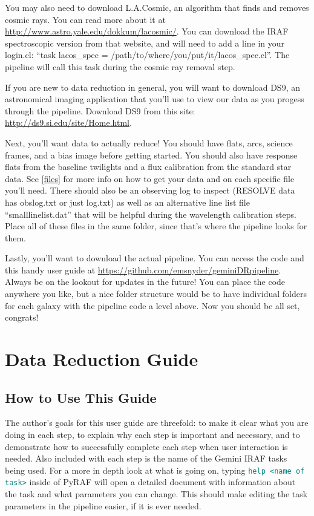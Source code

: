\documentclass[12pt]{report}
\newcommand{\ty}[1]{\textcolor{teal}{\texttt{#1}}}
\begin{document}
You may also need to download L.A.Cosmic, an algorithm that finds and removes cosmic rays. You can read more about it at \url{http://www.astro.yale.edu/dokkum/lacosmic/}. You can download the IRAF spectroscopic version from that website, and will need to add a line in your login.cl: ``task lacos\_spec = /path/to/where/you/put/it/lacos\_spec.cl''. The pipeline will call this task during the cosmic ray removal step.

If you are new to data reduction in general, you will want to download DS9, an astronomical imaging application that you'll use to view our data as you progess through the pipeline. Download DS9 from this site: \url{http://ds9.si.edu/site/Home.html}.

Next, you'll want data to actually reduce! You should have flats, arcs, science frames, and a bias image before getting started. You should also have response flats from the baseline twilights and a flux calibration from the standard star data. See \autoref{files} for more info on how to get your data and on each specific file you'll need. There should also be an observing log to inspect (RESOLVE data has obslog.txt or just log.txt) as well as an alternative line list file ``smalllinelist.dat'' that will be helpful during the wavelength calibration steps. Place all of these files in the same folder, since that's where the pipeline looks for them. 

Lastly, you'll want to download the actual pipeline. You can access the code and this handy user guide at \url{https://github.com/emsnyder/geminiDRpipeline}. Always be on the lookout for updates in the future! You can place the code anywhere you like, but a nice folder structure would be to have individual folders for each galaxy with the pipeline code a level above. Now you should be all set, congrats!

\chapter{Data Reduction Guide}

\section{How to Use This Guide}
The author's goals for this user guide are threefold: to make it clear what you are doing in each step, to explain why each step is important and necessary, and to demonstrate how to successfully complete each step when user interaction is needed. Also included with each step is the name of the Gemini IRAF tasks being used. For a more in depth look at what is going on, typing \ty{help <name of task>} inside of PyRAF will open a detailed document with information about the task and what parameters you can change. This should make editing the task parameters in the pipeline easier, if it is ever needed.
\end{document}
